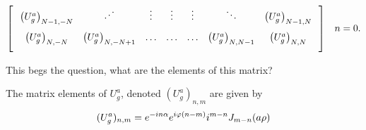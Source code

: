 \documentclass{article}
\begin{document}
\[\begin{matrix}
\begin{bmatrix}
            \hspace{0.25cm} \left(U^{a}_{g}\right)_{N-1,-N}  & \iddots                          & \vdots                         & \vdots                        & \vdots                          & \ddots                          & \left(U^{a}_{g}\right)_{N-1,N}     \hspace{0.25cm} \vspace{0.25cm} \\
            \hspace{0.25cm} \left(U^{a}_{g}\right)_{N,-N}    & \left(U^{a}_{g}\right)_{N,-N+1}  & \ldots                         & \ldots                        & \ldots  & \left(U^{a}_{g}\right)_{N,N-1}  & \left(U^{a}_{g}\right)_{N,N}      \hspace{0.25cm} \vspace{0.25cm} \\
        \end{bmatrix}
            &  n=0.
             \\
    \end{matrix}
\]%
\normalsize

This begs the question, what are the elements of this matrix? 

\begin{theorem}
    The matrix elements of $U^{a}_{g}$, denoted $(U^{a}_{g})_{n,m}$ are given by
    \[%
        (U^{a}_{g})_{n,m} = {e^{-in\alpha} e^{i\varphi(n-m)}i^{m-n}J_{m-n}(a\rho)}  \\ 
    \]%
\end{theorem}
\end{document}
